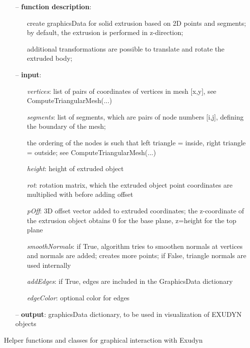 \begin{itemize}[leftmargin=1.4cm]
\begin{itemize}[leftmargin=1.4cm]
\begin{itemize}[leftmargin=0.5cm]
\begin{itemize}[leftmargin=1.4cm]
\begin{itemize}[leftmargin=1.4cm]
\begin{itemize}[leftmargin=0.5cm]
\begin{itemize}[leftmargin=1.4cm]
\begin{itemize}[leftmargin=0.5cm]
\begin{itemize}[leftmargin=0.7cm]
\item[--]
{\bf function description}: \vspace{-6pt}
\begin{itemize}[leftmargin=1.2cm]
\setlength{\itemindent}{-0.7cm}
\item[]create graphicsData for solid extrusion based on 2D points and segments; by default, the extrusion is performed in z-direction;
\item[]additional transformations are possible to translate and rotate the extruded body;
\end{itemize}
\item[--]
{\bf input}: \vspace{-6pt}
\begin{itemize}[leftmargin=1.2cm]
\setlength{\itemindent}{-0.7cm}
\item[]{\it vertices}: list of pairs of coordinates of vertices in mesh [x,y], see ComputeTriangularMesh(...)
\item[]{\it segments}: list of segments, which are pairs of node numbers [i,j], defining the boundary of the mesh;
\item[]the ordering of the nodes is such that left triangle = inside, right triangle = outside; see ComputeTriangularMesh(...)
\item[]{\it height}:   height of extruded object
\item[]{\it rot}:      rotation matrix, which the extruded object point coordinates are multiplied with before adding offset
\item[]{\it pOff}:     3D offset vector added to extruded coordinates; the z-coordinate of the extrusion object obtains 0 for the base plane, z=height for the top plane
\item[]{\it smoothNormals}: if True, algorithm tries to smoothen normals at vertices and normals are added; creates more points; if False, triangle normals are used internally
\item[]{\it addEdges}: if True, edges are included in the GraphicsData dictionary
\item[]{\it edgeColor}: optional color for edges
\end{itemize}
\item[--]
{\bf output}: graphicsData dictionary, to be used in visualization of EXUDYN objects
\vspace{12pt}\end{itemize}
%
\label{sec:module:GUI}
  Helper functions and classes for graphical interaction with Exudyn
\begin{itemize}[leftmargin=1.4cm]

\end{itemize}
\end{itemize}
\end{itemize}
\end{itemize}
\end{itemize}
\end{itemize}
\end{itemize}
\end{itemize}
\end{itemize}
